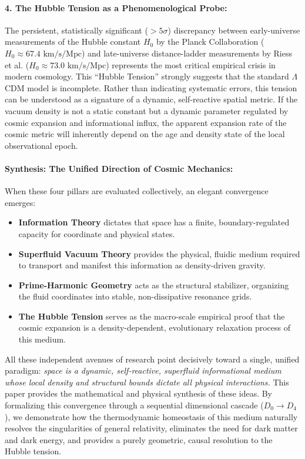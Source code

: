 \documentclass[11pt,a4paper]{article}
\theoremstyle{plain}
\theoremstyle{definition}
\theoremstyle{remark}
\begin{document}
\paragraph{4. The Hubble Tension as a Phenomenological Probe:}
The persistent, statistically significant ($>5\sigma$) discrepancy between early-universe measurements of the Hubble constant $H_0$ by the Planck Collaboration \cite{planck2020} ($H_0 \approx 67.4\text{ km/s/Mpc}$) and late-universe distance-ladder measurements by Riess et al. \cite{riess2021} ($H_0 \approx 73.0\text{ km/s/Mpc}$) represents the most critical empirical crisis in modern cosmology. This ``Hubble Tension'' strongly suggests that the standard $\Lambda$CDM model is incomplete. Rather than indicating systematic errors, this tension can be understood as a signature of a dynamic, self-reactive spatial metric. If the vacuum density is not a static constant but a dynamic parameter regulated by cosmic expansion and informational influx, the apparent expansion rate of the cosmic metric will inherently depend on the age and density state of the local observational epoch.

\paragraph{Synthesis: The Unified Direction of Cosmic Mechanics:}
When these four pillars are evaluated collectively, an elegant convergence emerges:
\begin{itemize}
    \item \textbf{Information Theory} dictates that space has a finite, boundary-regulated capacity for coordinate and physical states.
    \item \textbf{Superfluid Vacuum Theory} provides the physical, fluidic medium required to transport and manifest this information as density-driven gravity.
    \item \textbf{Prime-Harmonic Geometry} acts as the structural stabilizer, organizing the fluid coordinates into stable, non-dissipative resonance grids.
    \item \textbf{The Hubble Tension} serves as the macro-scale empirical proof that the cosmic expansion is a density-dependent, evolutionary relaxation process of this medium.
\end{itemize}
All these independent avenues of research point decisively toward a single, unified paradigm: \textit{space is a dynamic, self-reactive, superfluid informational medium whose local density and structural bounds dictate all physical interactions.} This paper provides the mathematical and physical synthesis of these ideas. By formalizing this convergence through a sequential dimensional cascade ($D_0 \to D_4$), we demonstrate how the thermodynamic homeostasis of this medium naturally resolves the singularities of general relativity, eliminates the need for dark matter and dark energy, and provides a purely geometric, causal resolution to the Hubble tension.
\end{document}
